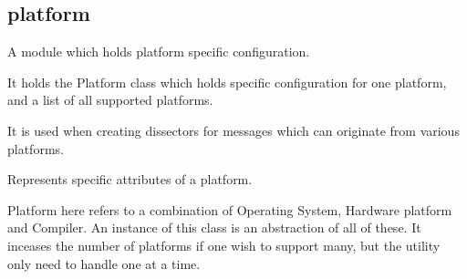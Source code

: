 \documentclass[A4paper,10pt,english]{sphinxmanual}
\begin{document}
\subsection{platform}
\label{devel/code:platform}\label{devel/code:module-platform}
A module which holds platform specific configuration.

It holds the Platform class which holds specific configuration
for one platform, and a list of all supported platforms.

It is used when creating dissectors for messages which can originate
from various platforms.

\begin{fulllineitems}
\label{devel/code:platform.Platform}
Represents specific attributes of a platform.

Platform here refers to a combination of Operating System,
Hardware platform and Compiler. An instance of this class is an
abstraction of all of these. It inceases the number of platforms
if one wish to support many, but the utility only need to handle
one at a time.

\begin{fulllineitems}
\label{devel/code:platform.Platform.big}
\end{fulllineitems}


\begin{fulllineitems}
\label{devel/code:platform.Platform.little}
\end{fulllineitems}


\begin{fulllineitems}
\label{devel/code:platform.Platform.mappings}
\end{fulllineitems}


\begin{fulllineitems}
\label{devel/code:platform.Platform.flags}
\end{fulllineitems}


\end{fulllineitems}
\end{document}
